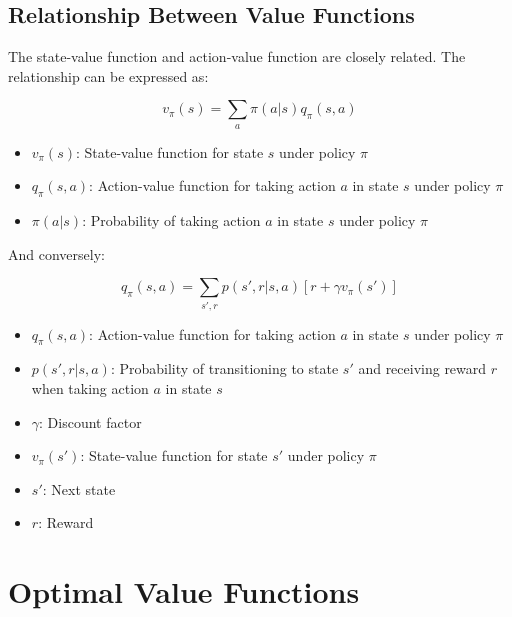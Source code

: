 \documentclass{article}
\begin{document}
\subsection{Relationship Between Value Functions}

The state-value function and action-value function are closely related. The relationship can be expressed as:

\begin{equation}
v_\pi(s) = \sum_a \pi(a|s) q_\pi(s,a)
\end{equation}

\begin{tcolorbox}[colframe=blue!50!black, colback=blue!10, title=Notation Overview]
\begin{itemize}
    \item $v_\pi(s)$: State-value function for state $s$ under policy $\pi$
    \item $q_\pi(s,a)$: Action-value function for taking action $a$ in state $s$ under policy $\pi$
    \item $\pi(a|s)$: Probability of taking action $a$ in state $s$ under policy $\pi$
\end{itemize}
\end{tcolorbox}

And conversely:

\begin{equation}
q_\pi(s,a) = \sum_{s',r} p(s',r|s,a)[r + \gamma v_\pi(s')]
\end{equation}

\begin{tcolorbox}[colframe=blue!50!black, colback=blue!10, title=Notation Overview]
\begin{itemize}
    \item $q_\pi(s,a)$: Action-value function for taking action $a$ in state $s$ under policy $\pi$
    \item $p(s',r|s,a)$: Probability of transitioning to state $s'$ and receiving reward $r$ when taking action $a$ in state $s$
    \item $\gamma$: Discount factor
    \item $v_\pi(s')$: State-value function for state $s'$ under policy $\pi$
    \item $s'$: Next state
    \item $r$: Reward
\end{itemize}
\end{tcolorbox}

\section{Optimal Value Functions}
\end{document}
